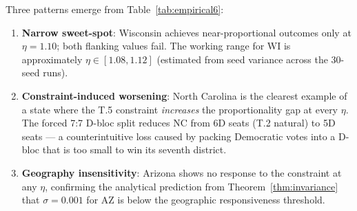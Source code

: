 \begin{table}[h]
\centering
\caption{Empirical proportionality gap $\Delta$ (pp) from actual METIS runs:
  6 states $\times$ 3 $\eta$ values.
  T.2 column is the geography-only baseline (no partisan constraint).
  Best $\eta$ is highlighted.
  \textuparrow{} = improvement over T.2; \textdownarrow{} = worsening;
  $\approx$ = no change. All runs: METIS 5.1.0, 30 seeds, 1.5\% balance tolerance.}
\label{tab:empirical6}
\small
{}
\end{table}

\noindent Three patterns emerge from Table~\ref{tab:empirical6}:
\begin{enumerate}
  \item \textbf{Narrow sweet-spot}: Wisconsin achieves near-proportional outcomes
    only at $\eta = 1.10$; both flanking values fail. The working range for WI
    is approximately $\eta \in [1.08, 1.12]$ (estimated from seed variance across
    the 30-seed runs).
  \item \textbf{Constraint-induced worsening}: North Carolina is the clearest
    example of a state where the T.5 constraint \emph{increases} the proportionality
    gap at every $\eta$. The forced 7:7 D-bloc split reduces NC from 6D seats
    (T.2 natural) to 5D seats --- a counterintuitive loss caused by packing
    Democratic votes into a D-bloc that is too small to win its seventh district.
  \item \textbf{Geography insensitivity}: Arizona shows no response to the
    constraint at any $\eta$, confirming the analytical prediction from
    Theorem~\ref{thm:invariance} that $\sigma = 0.001$ for AZ is below the
    geographic responsiveness threshold.
\end{enumerate}

